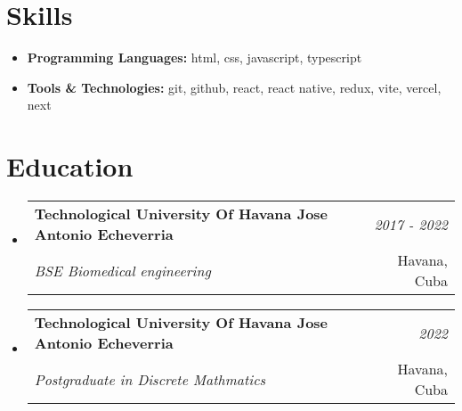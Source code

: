 \documentclass[a4paper,11pt]{article}
\makeatletter
\newcommand{\resumeItem}[2]{
    \item { \textbf{#1}{\hspace{0.5mm}#2 \vspace{-0.5mm}} }
}
\newcommand{\resumeSubheading}[4]{
\vspace{0.5mm}\item
    \begin{tabular*}{0.98\textwidth}[t]{l@{\extracolsep{\fill}}r}
        \textbf{#1} & \textit{\footnotesize{#4}} \\
        \textit{\footnotesize{#3}} &  \footnotesize{#2}\\
    \end{tabular*}
    \vspace{-2.4mm}
}
\newcommand{\resumeSubItem}[2]{\resumeItem{#1}{#2}\vspace{-4pt}}
\newcommand{\resumeSubHeadingListStart}{\begin{itemize}[leftmargin=*,labelsep=1mm]}
\newcommand{\resumeHeadingSkillStart}{\begin{itemize}[leftmargin=*,itemsep=1.7mm, rightmargin=2ex]}
\newcommand{\resumeSubHeadingListEnd}{\end{itemize}\vspace{2mm}}
\newcommand{\resumeHeadingSkillEnd}{\end{itemize}\vspace{-2mm}}
\makeatother
\begin{document}
\section{\textbf{Skills}}
\vspace{-0.4mm}
\resumeHeadingSkillStart
    \resumeSubItem{Programming Languages:}
        { html, css, javascript, typescript }
    \resumeSubItem{Tools \& Technologies:}
        { git, github, react, react native, redux, vite, vercel, next }
\resumeHeadingSkillEnd


\section{\textbf{Education}}
\vspace{-0.4mm}
\resumeSubHeadingListStart
\resumeSubheading
{Technological University Of Havana Jose Antonio Echeverria}{Havana, Cuba}
{BSE Biomedical engineering}{2017 - 2022}

\resumeSubheading
{Technological University Of Havana Jose Antonio Echeverria}{Havana, Cuba}
{Postgraduate in Discrete Mathmatics}{2022}
\resumeSubHeadingListEnd
\vspace{-6mm}
\end{document}
